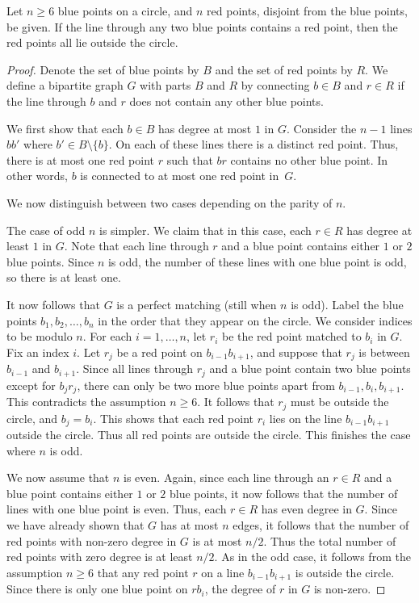 \documentclass[10pt,a4paper]{amsart}
\begin{document}
\begin{lemma}\label{lemma:3}
Let $n\geq 6$ blue points on a circle, and $n$ red points, disjoint from the blue points, be given.
If the line through any two blue points contains a red point, then the red points all lie outside the circle.
\end{lemma}

\begin{proof}
Denote the set of blue points by $B$ and the set of red points by $R$.
We define a bipartite graph $G$ with parts $B$ and $R$ by connecting $b\in B$ and $r\in R$ if the line through $b$ and $r$ does not contain any other blue points.

We first show that each $b\in B$ has degree at most $1$ in $G$.
Consider the $n-1$ lines $bb'$ where $b'\in B\setminus\{b\}$.
On each of these lines there is a distinct red point.
Thus, there is at most one red point $r$ such that $br$ contains no other blue point.
In other words, $b$ is connected to at most one red point in~$G$.

We now distinguish between two cases depending on the parity of $n$.

The case of odd $n$ is simpler.
We claim that in this case, each $r\in R$ has degree at least $1$ in $G$.
Note that each line through $r$ and a blue point contains either $1$ or $2$ blue points.
Since $n$ is odd, the number of these lines with one blue point is odd, so there is at least one.

It now follows that $G$ is a perfect matching (still when $n$ is odd).
Label the blue points $b_1,b_2,\dots,b_n$ in the order that they appear on the circle.
We consider indices to be modulo $n$.
For each $i=1,\dots,n$, let $r_i$ be the red point matched to $b_i$ in $G$.
Fix an index $i$.
Let $r_j$ be a red point on $b_{i-1}b_{i+1}$, and suppose that $r_j$ is between $b_{i-1}$ and $b_{i+1}$.
Since all lines through $r_j$ and a blue point contain two blue points except for $b_jr_j$, there can only be two more blue points apart from $b_{i-1}, b_i, b_{i+1}$.
This contradicts the assumption $n\geq 6$.
It follows that $r_j$ must be outside the circle, and $b_j=b_i$.
This shows that each red point $r_i$ lies on the line $b_{i-1}b_{i+1}$ outside the circle.
Thus all red points are outside the circle.
This finishes the case where $n$ is odd.

We now assume that $n$ is even.
Again, since each line through an $r\in R$ and a blue point contains either $1$ or $2$ blue points, it now follows that the number of lines with one blue point is even.
Thus, each $r\in R$ has even degree in $G$.
Since we have already shown that $G$ has at most $n$ edges, it follows that the number of red points with non-zero degree in $G$ is at most $n/2$.
Thus the total number of red points with zero degree is at least $n/2$.
As in the odd case, it follows from the assumption $n\geq 6$ that any red point $r$ on a line $b_{i-1}b_{i+1}$ is outside the circle.
Since there is only one blue point on $rb_i$, the degree of $r$ in $G$ is non-zero.


\end{proof}
\end{document}
